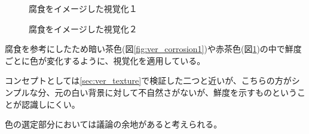 \begin{figure}[htbp]
  \begin{minipage}{0.5\hsize}
    \begin{center}
    \end{center}
    \caption{腐食をイメージした視覚化１}
    \label{fig:ver_corrosion1}
  \end{minipage}
  \begin{minipage}{0.5\hsize}
    \begin{center}
    \end{center}
    \caption{腐食をイメージした視覚化２}
    \label{fig:ver_corrosion2}
  \end{minipage}
\end{figure}

腐食を参考にしたため暗い茶色(図\ref{fig:ver_corrosion1})や赤茶色(図\ref{fig:ver_corrosion2})の中で鮮度ごとに色が変化するように、視覚化を適用している。

コンセプトとしては\ref{sec:ver_texture}で検証した二つと近いが、こちらの方がシンプルな分、元の白い背景に対して不自然さがないが、鮮度を示すものということが認識しにくい。

色の選定部分においては議論の余地があると考えられる。

